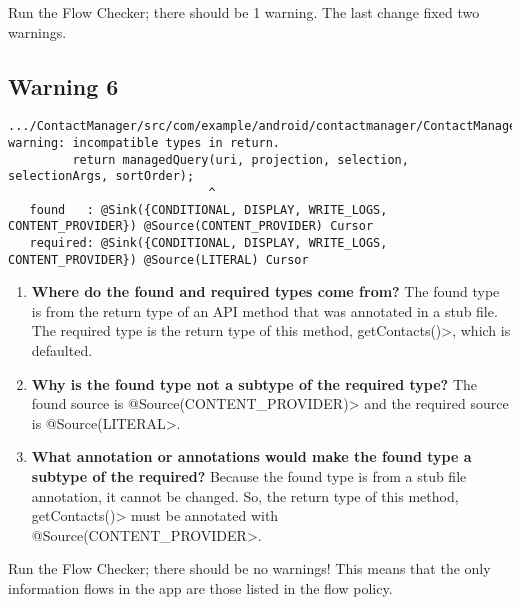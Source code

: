     Run the Flow Checker; there should be 1 warning.  The last change fixed two warnings.
    
  \subsection{Warning 6}
   \begin{Verbatim}
.../ContactManager/src/com/example/android/contactmanager/ContactManager.java:118: 
warning: incompatible types in return.
         return managedQuery(uri, projection, selection, selectionArgs, sortOrder);
                            ^
   found   : @Sink({CONDITIONAL, DISPLAY, WRITE_LOGS, CONTENT_PROVIDER}) @Source(CONTENT_PROVIDER) Cursor
   required: @Sink({CONDITIONAL, DISPLAY, WRITE_LOGS, CONTENT_PROVIDER}) @Source(LITERAL) Cursor
    \end{Verbatim} 

 \begin{enumerate}

\item\textbf{Where do the found and required types come from?}
   The found type is from the return type of an API method that was annotated in a stub file.  The required type is the return type of this method, \<getContacts()>, which is defaulted. 
  \item\textbf{ Why is the found type not a subtype of the required type?}
  The found source is \<@Source(CONTENT\_PROVIDER)> and the required source is 
  \<@Source(LITERAL>.
  \item\textbf{What annotation or annotations would make the found type a subtype of the required?}
  Because the found type is from a stub file annotation, it cannot be changed. So, the return type of this method, \<getContacts()> must be annotated with 
  \<@Source(CONTENT\_PROVIDER>.\newline
  
              \end{enumerate}

    Run the Flow Checker; there should be no warnings!  This means that the only information 
    flows in the app are those listed in the flow policy. 

 
%
%
%
%
